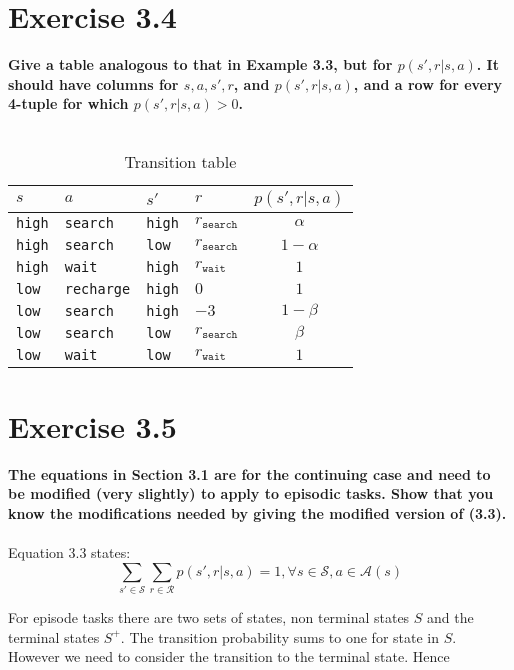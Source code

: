 \documentclass[a4paper,11pt]{article}
\numberwithin{equation}{section}
\theoremstyle{remark}
\begin{document}
\section{Exercise 3.4}
\textbf{
Give a table analogous to that in Example 3.3, but for $p(s',r| s,a)$. It
should have columns for $s, a, s', r$, and $p(s', r | s, a)$, and a row for every 4-tuple for which
$p(s',r| s,a) > 0$. 
}
\\ \\
\begin{table}[h!]
\centering
\begin{tabular}{llll|c}
    $s$ & $a$ & $s'$ & $r$ & $p(s', r | s, a)$ \\
    \hline
     \texttt{high}& \texttt{search}&  \texttt{high}&  $r_{\texttt{search}}$& $\alpha$  \\
     \texttt{high}& \texttt{search}&  \texttt{low}&   $r_{\texttt{search}}$& $1 - \alpha$ \\
     \texttt{high}& \texttt{wait}&  \texttt{high}&   $r_{\texttt{wait}}$&  $1$ \\
     \texttt{low}& \texttt{recharge}&   \texttt{high}&    $0$&   $1$\\
     \texttt{low}& \texttt{search}&  \texttt{high}&  $-3$& $1 - \beta$  \\
     \texttt{low}& \texttt{search}&  \texttt{low}&   $r_{\texttt{search}}$& $\beta $\\
     \texttt{low}& \texttt{wait}&  \texttt{low}&   $r_{\texttt{wait}}$&  $1$
\end{tabular}
\caption{Transition table}
\end{table}


\section{Exercise 3.5}
\textbf{
The equations in Section 3.1 are for the continuing case and need to be
modified (very slightly) to apply to episodic tasks. Show that you know the modifications
needed by giving the modified version of (3.3). 
}
\\ \\
Equation 3.3 states:
\begin{equation*}
\sum_{s'\in \mathcal{S}}\sum_{r\in \mathcal{R}}{p(s',r|s,a)=1}, \forall s\in \mathcal{S}, a\in \mathcal{A}(s)
\end{equation*}

For episode tasks there are two sets of states, non terminal states $S$ and the terminal states $S^+$. The transition probability sums to one for state in $S$. However we need to consider the transition to the terminal state. Hence
\end{document}
